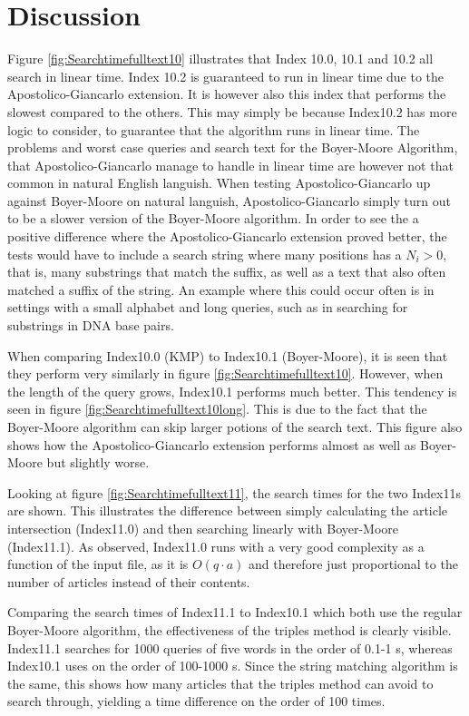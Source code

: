 \section{Discussion}
Figure \ref{fig:Searchtimefulltext10} illustrates that Index 10.0, 10.1 and 10.2 all search in linear time. Index 10.2 is guaranteed to run in linear time due to the Apostolico-Giancarlo extension. It is however also this index that performs the slowest compared to the others. This may simply be because Index10.2 has more logic to consider, to guarantee that the algorithm runs in linear time. The problems and worst case queries and search text for the Boyer-Moore Algorithm, that Apostolico-Giancarlo manage to handle in linear time are however not that common in natural English languish. When testing Apostolico-Giancarlo up against Boyer-Moore on natural languish, Apostolico-Giancarlo simply turn out to be a slower version of the Boyer-Moore algorithm. In order to see the a positive difference where the Apostolico-Giancarlo extension proved better, the tests would have to include a search string where many positions has a $N_i>0$, that is, many substrings that match the suffix, as well as a text that also often matched a suffix of the string. An example where this could occur often is in settings with a small alphabet and long queries, such as in searching for substrings in DNA base pairs. 

When comparing Index10.0 (KMP) to Index10.1 (Boyer-Moore), it is seen that they perform very similarly in figure \ref{fig:Searchtimefulltext10}. However, when the length of the query grows, Index10.1 performs much better. This tendency is seen in figure \ref{fig:Searchtimefulltext10long}. This is due to the fact that the Boyer-Moore algorithm can skip larger potions of the search text. This figure also shows how the Apostolico-Giancarlo extension performs almost as well as Boyer-Moore but slightly worse. 

Looking at figure \ref{fig:Searchtimefulltext11}, the search times for the two Index11s are shown. This illustrates the difference between simply calculating the article intersection (Index11.0) and then searching linearly with Boyer-Moore (Index11.1). As observed, Index11.0 runs with a very good complexity as a function of the input file, as it is $O(q\cdot a)$ and therefore just proportional to the number of articles instead of their contents. 

Comparing the search times of Index11.1 to Index10.1 which both use the regular Boyer-Moore algorithm, the effectiveness of the triples method is clearly visible. Index11.1 searches for 1000 queries of five words in the order of 0.1-1 s, whereas Index10.1 uses on the order of 100-1000 s. Since the string matching algorithm is the same, this shows how many articles that the triples method can avoid to search through, yielding a time difference on the order of 100 times. 

